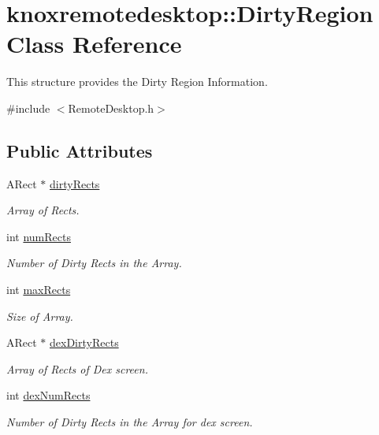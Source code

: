 \hypertarget{classknoxremotedesktop_1_1DirtyRegion}{\section{knoxremotedesktop\-:\-:\-Dirty\-Region \-Class \-Reference}
\label{classknoxremotedesktop_1_1DirtyRegion}
}


\-This structure provides the \-Dirty \-Region \-Information.  




{\ttfamily \#include $<$\-Remote\-Desktop.\-h$>$}

\subsection*{\-Public \-Attributes}
\begin{DoxyCompactItemize}
\item 
\-A\-Rect $\ast$ \hyperlink{classknoxremotedesktop_1_1DirtyRegion_a46d58ad2c718f79613f9ad1b02d64c3d}{dirty\-Rects}
\begin{DoxyCompactList}\small\item\em \-Array of \-Rects. \end{DoxyCompactList}\item 
int \hyperlink{classknoxremotedesktop_1_1DirtyRegion_a433b848a889223e6b404cec9e8db0c7d}{num\-Rects}
\begin{DoxyCompactList}\small\item\em \-Number of \-Dirty \-Rects in the \-Array. \end{DoxyCompactList}\item 
int \hyperlink{classknoxremotedesktop_1_1DirtyRegion_a65b638db44b5b39191e0d72123d9ccc8}{max\-Rects}
\begin{DoxyCompactList}\small\item\em \-Size of \-Array. \end{DoxyCompactList}\item 
\-A\-Rect $\ast$ \hyperlink{classknoxremotedesktop_1_1DirtyRegion_a457e725e722f93c7312fa85b2f43eb77}{dex\-Dirty\-Rects}
\begin{DoxyCompactList}\small\item\em \-Array of \-Rects of \-Dex screen. \end{DoxyCompactList}\item 
int \hyperlink{classknoxremotedesktop_1_1DirtyRegion_a5656ac769cbdd1a65aa215f87f1cab25}{dex\-Num\-Rects}
\begin{DoxyCompactList}\small\item\em \-Number of \-Dirty \-Rects in the \-Array for dex screen. \end{DoxyCompactList}\end{DoxyCompactItemize}


